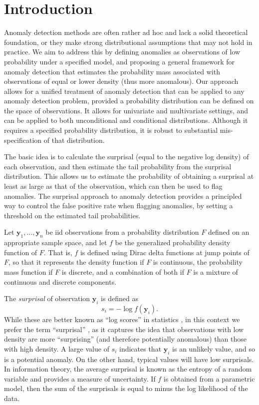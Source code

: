 \documentclass[
  12pt]{article}
\theoremstyle{plain}
\theoremstyle{plain}
\theoremstyle{definition}
\theoremstyle{plain}
\theoremstyle{remark}
\begin{document}
\section{Introduction}\label{introduction}

Anomaly detection methods are often rather ad hoc and lack a solid
theoretical foundation, or they make strong distributional assumptions
that may not hold in practice. We aim to address this by defining
anomalies as observations of low probability under a specified model,
and proposing a general framework for anomaly detection that estimates
the probability mass associated with observations of equal or lower
density (thus more anomalous). Our approach allows for a unified
treatment of anomaly detection that can be applied to any anomaly
detection problem, provided a probability distribution can be defined on
the space of observations. It allows for univariate and multivariate
settings, and can be applied to both unconditional and conditional
distributions. Although it requires a specified probability
distribution, it is robust to substantial mis-specification of that
distribution.

The basic idea is to calculate the surprisal (equal to the negative log
density) of each observation, and then estimate the tail probability
from the surprisal distribution. This allows us to estimate the
probability of obtaining a surprisal at least as large as that of the
observation, which can then be used to flag anomalies. The surprisal
approach to anomaly detection provides a principled way to control the
false positive rate when flagging anomalies, by setting a threshold on
the estimated tail probabilities.

Let \(\bm{y}_1,\dots,\bm{y}_n\) be iid observations from a probability
distribution \(F\) defined on an appropriate sample space, and let \(f\)
be the generalized probability density function of \(F\). That is, \(f\)
is defined using Dirac delta functions at jump points of \(F\), so that
it represents the density function if \(F\) is continuous, the
probability mass function if \(F\) is discrete, and a combination of
both if \(F\) is a mixture of continuous and discrete components.

The \emph{surprisal} of observation \(\bm{y}_i\) is defined as
\citep{Stone2022} \[
s_i=-\log f(\bm{y}_i).
\] While these are better known as ``log scores'' in statistics
\citep{Good1952-zw}, in this context we prefer the term ``surprisal''
\citep[coined by][]{Tribus61}, as it captures the idea that observations
with low density are more ``surprising'' (and therefore potentially
anomalous) than those with high density. A large value of \(s_i\)
indicates that \(\bm{y}_i\) is an unlikely value, and so is a potential
anomaly. On the other hand, typical values will have low surprisals. In
information theory, the average surprisal is known as the entropy of a
random variable \citep{Cover2006, Stone2022} and provides a measure of
uncertainty. If \(f\) is obtained from a parametric model, then the sum
of the surprisals is equal to minus the log likelihood of the data.
\end{document}
